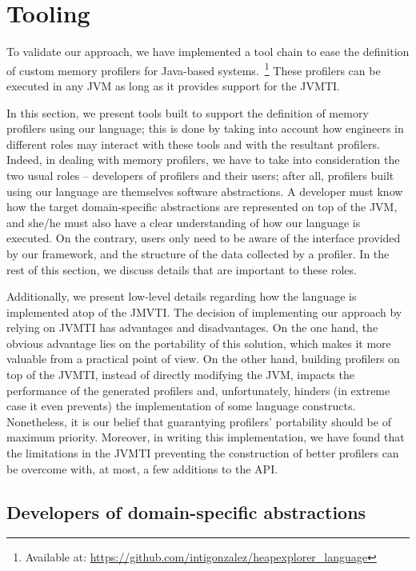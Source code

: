 \section{Tooling}\label{sec:dsl-implementation}

To validate our approach, we have implemented a tool chain to ease the definition of custom memory profilers for Java-based systems.~\footnote{Available at: \url{https://github.com/intigonzalez/heapexplorer\_language}}
These profilers can be executed in any JVM as long as it provides support for the JVMTI.

In this section, we present tools built to support the definition of memory profilers using our language; this is done by taking into account how engineers in different roles may interact with these tools and with the resultant profilers.
Indeed, in dealing with memory profilers, we have to take into consideration the two usual roles -- developers of profilers and their users; after all, profilers built using our language are themselves software abstractions.
A developer must know how the target domain-specific abstractions are represented on top of the JVM, and she/he must also have a clear understanding of how our language is executed.
On the contrary, users only need to be aware of the interface provided by our framework, and the structure of the data collected by a profiler.
In the rest of this section, we discuss details that are important to these roles.

Additionally, we present low-level details regarding how the language is implemented atop of the JMVTI.
The decision of implementing our approach by relying on JVMTI has advantages and disadvantages.
On the one hand, the obvious advantage lies on the portability of this solution, which makes it more valuable from a practical point of view.
On the other hand, building profilers on top of the JVMTI, instead of directly modifying the JVM, impacts the performance of the generated profilers and, unfortunately, hinders (in extreme case it even prevents) the implementation of some language constructs.
Nonetheless, it is our belief that guarantying profilers' portability should be of maximum priority.
Moreover, in writing this implementation, we have found that the limitations in the JVMTI preventing the construction of better profilers can be overcome with, at most, a few additions to the API.


\subsection{Developers of domain-specific abstractions}

